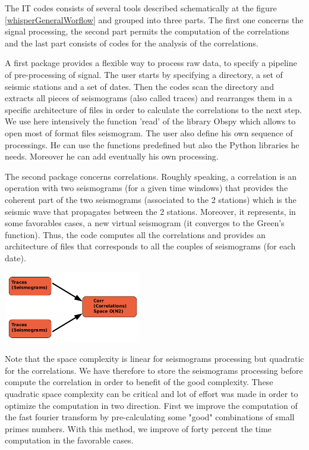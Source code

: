 \documentclass[a4paper, 10pt]{article}
\begin{document}
\begin{multicols}{2}
The IT codes consists of several tools described schematically at the figure \ref{whisperGeneralWorflow} and grouped into three parts. The first one concerns the signal processing, the second part permits the computation of the correlations and the last part consists of codes for the analysis of the correlations.

A first package provides a flexible way to process raw data, to specify a pipeline of pre-processing of signal.
The user starts by specifying a directory, a set of seismic stations and a set of dates. Then the codes scan the directory
and extracts all pieces of seismograms (also called traces) and rearranges them in a specific architecture of files in order to calculate the correlations to the next step.
We use here intensively the function 'read' of the library Obspy which allows to open most of format files seismogram.
The user also define his own sequence of processings. He can use the functions predefined but also the Python libraries he needs. 
Moreover he can add eventually his own processing.

The second package concerns correlations. 
Roughly speaking, a correlation is an operation with two seismograms (for a given time windows) that provides the coherent part of the two seismograms 
(associated to the 2 stations) which is the seismic wave that propagates between the 2 stations.
Moreover, it represents, in some favorables cases, a new virtual seismogram (it converges to the Green's function). Thus, the code computes all the correlations and provides an architecture of files that corresponds to all the couples of seismograms (for each date). 

\begin{center}%
\centering
{}
\includegraphics[width=6cm]{schemaCorrelationStep.png}
\end{center}

Note that the space complexity is linear for seismograms processing but quadratic for the correlations. We have therefore to store the seismograms processing before compute the correlation in order to benefit of the good complexity.
These quadratic space complexity can be critical and lot of effort was made in order to optimize the computation in two direction. First we improve the computation of the fast fourier transform by pre-calculating some "good" combinations of small primes numbers. 
With this method, we improve of forty percent the time computation in the favorable cases.


\end{multicols}
\end{document}
